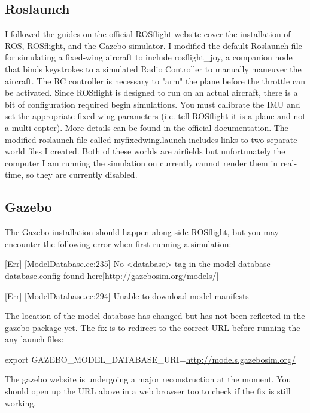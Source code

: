 \documentclass[11pt]{scrartcl} %
\begin{document}
\subsection{Roslaunch}
I followed the guides on the official ROSflight website cover the installation of ROS, ROSflight, and the Gazebo simulator. I modified the default Roslaunch file for simulating a fixed-wing aircraft to include rosflight\_joy, a companion node that binds keystrokes to a simulated Radio Controller to manually maneuver the aircraft. The RC controller is necessary to "arm" the plane before the throttle can be activated. Since ROSflight is designed to run on an actual aircraft, there is a bit of configuration required begin simulations. You must calibrate the IMU and set the appropriate fixed wing parameters (i.e. tell ROSflight it is a plane and not a multi-copter). More details can be found in the official documentation. The modified roslaunch file called myfixedwing.launch includes links to two separate world files I created. Both of these worlds are airfields but unfortunately the computer I am running the simulation on currently cannot render them in real-time, so they are currently disabled.

\subsection{Gazebo}
The Gazebo installation should happen along side ROSflight, but you may encounter the following error when first running a simulation: 

\small
\color{red}
[Err] [ModelDatabase.cc:235] No <database> tag in the model database database.config found here[\url{http://gazebosim.org/models/}]

[Err] [ModelDatabase.cc:294] Unable to download model manifests
\\
\color{black}
\normalsize

The location of the model database has changed but has not been reflected in the gazebo package yet. The fix is to redirect to the correct URL before running the any launch files:

\small
\color{green}
export GAZEBO\_MODEL\_DATABASE\_URI=\url{http://models.gazebosim.org/}
\\ \color{black}
\normalsize

The gazebo website is undergoing a major reconstruction at the moment. You should open up the URL above in a web browser too to check if the fix is still working.
\end{document}
